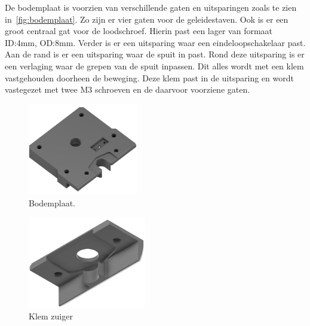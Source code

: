 De bodemplaat is voorzien van verschillende gaten en uitsparingen zoals te zien in\ \autoref{fig:bodemplaat}. Zo zijn er vier gaten voor de geleidestaven. Ook is er een groot centraal gat voor de loodschroef. Hierin past een lager van formaat ID:4mm, OD:8mm. Verder is er een uitsparing waar een eindeloopschakelaar past. Aan de rand is er een uitsparing waar de spuit in past. Rond deze uitsparing is er een verlaging waar de grepen van de spuit inpassen. Dit alles wordt met een klem vastgehouden doorheen de beweging. Deze klem past in de uitsparing en wordt vastegezet met twee M3 schroeven en de daarvoor voorziene gaten.
\\[12pt]\begin{minipage}[t]{0.49\textwidth}
    \vspace{0pt}
    \begin{figure}[H]
        \centering
        \includegraphics[height=4cm]{figures/Foundation_1_w.png}
        \caption{Bodemplaat.}\label{fig:bodemplaat}
    \end{figure}
\end{minipage}
\begin{minipage}[t]{0.49\textwidth}
    \vspace{0pt}
    \begin{figure}[H]
        \centering
        \includegraphics[height=4cm]{figures/Foundation_clamp_w.png}
        \caption{Klem zuiger}\label{fig:clamp}
    \end{figure}
\end{minipage}\\

